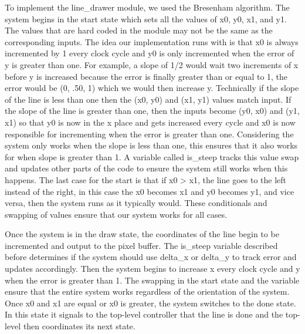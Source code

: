 \documentclass[11pt, titlepage]{article}
\begin{document}
            To implement the line\_drawer module, we used the Bresenham algorithm. The system begins in the start state which sets all the values of x0, y0, x1, and y1. The values that are hard coded in the module may not be the same as the corresponding inputs. The idea our implementation runs with is that x0 is always incremented by 1 every clock cycle and y0 is only incremented when the error of y is greater than one. For example, a slope of 1/2 would wait two increments of x before y is increased because the error is finally greater than or equal to 1, the error would be (0, .50, 1) which we would then increase y. Technically if the slope of the line is less than one then the (x0, y0) and (x1, y1) values match input. If the slope of the line is greater than one, then the inputs become (y0, x0) and (y1, x1) so that y0 is now in the x place and gets increased every cycle and x0 is now responsible for incrementing when the error is greater than one. Considering the system only works when the slope is less than one, this ensures that it also works for when slope is greater than 1. A variable called is\_steep tracks this value swap and updates other parts of the code to ensure the system still works when this happens. The last case for the start is that if x0 > x1, the line goes to the left instead of the right, in this case the x0 becomes x1 and y0 becomes y1, and vice versa, then the system runs as it typically would. These conditionals and swapping of values ensure that our system works for all cases. 
            
            Once the system is in the draw state, the coordinates of the line begin to be incremented and output to the pixel buffer. The is\_steep variable described before determines if the system should use delta\_x or delta\_y to track error and updates accordingly. Then the system begins to increase x every clock cycle and y when the error is greater than 1. The swapping in the start state and the variable ensure that the entire system works regardless of the orientation of the system. Once x0 and x1 are equal or x0 is greater, the system switches to the done state. In this state it signals to the top-level controller that the line is done and the top-level then coordinates its next state.
        
\end{document}

